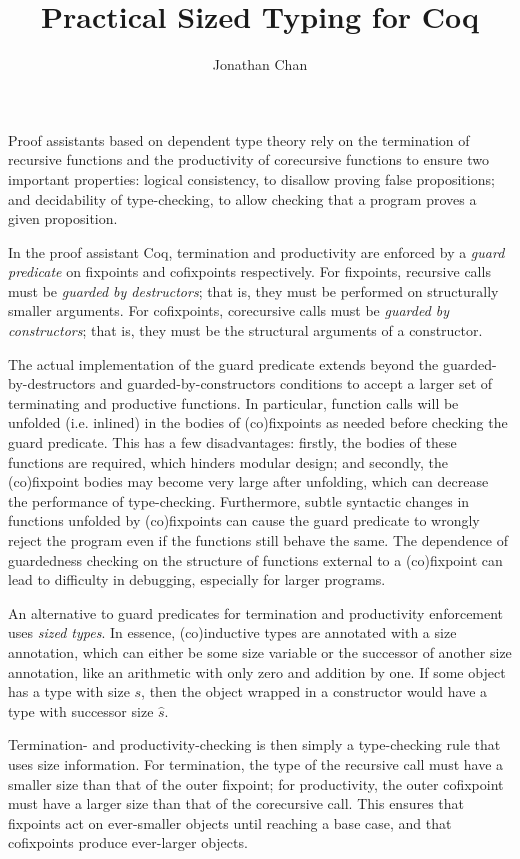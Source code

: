 \documentclass[sigplan,screen,authorversion,10pt,nonacm,natbib=false]{acmart}
\title{Practical Sized Typing for Coq}
\author{\vspace{-1em} Jonathan Chan}
\newcommand{\coinductive}{(co)\-inductive }
\newcommand{\cofixpoint}{(co)\-fixpoint }
\newcommand{\cofixpoints}{(co)\-fixpoints }
\begin{document}
\maketitle

Proof assistants based on dependent type theory rely on the termination of recursive functions and the productivity of corecursive functions to ensure two important properties: logical consistency, to disallow proving false propositions; and decidability of type-checking, to allow checking that a program proves a given proposition.

In the proof assistant Coq, termination and productivity are enforced by a \textit{guard predicate} on fixpoints and cofixpoints respectively. For fixpoints, recursive calls must be \textit{guarded by destructors}; that is, they must be performed on structurally smaller arguments. For cofixpoints, corecursive calls must be \textit{guarded by constructors}; that is, they must be the structural arguments of a constructor.

The actual implementation of the guard predicate extends beyond the guarded-by-destructors and guarded-by-constructors conditions to accept a larger set of terminating and productive functions. In particular, function calls will be unfolded (i.e. inlined) in the bodies of \cofixpoints as needed before checking the guard predicate. This has a few disadvantages: firstly, the bodies of these functions are required, which hinders modular design; and secondly, the \cofixpoint bodies may become very large after unfolding, which can decrease the performance of type-checking. Furthermore, subtle syntactic changes in functions unfolded by \cofixpoints can cause the guard predicate to wrongly reject the program even if the functions still behave the same. The dependence of guardedness checking on the structure of functions external to a \cofixpoint can lead to difficulty in debugging, especially for larger programs.

An alternative to guard predicates for termination and productivity enforcement uses \textit{sized types}. In essence, \coinductive types are annotated with a size annotation, which can either be some size variable or the successor of another size annotation, like an arithmetic with only zero and addition by one. If some object has a type with size $s$, then the object wrapped in a constructor would have a type with successor size $\hat{s}$.

Termination- and productivity-checking is then simply a type-checking rule that uses size information. For termination, the type of the recursive call must have a smaller size than that of the outer fixpoint; for productivity, the outer cofixpoint must have a larger size than that of the corecursive call. This ensures that fixpoints act on ever-smaller objects until reaching a base case, and that cofixpoints produce ever-larger objects.
\end{document}
